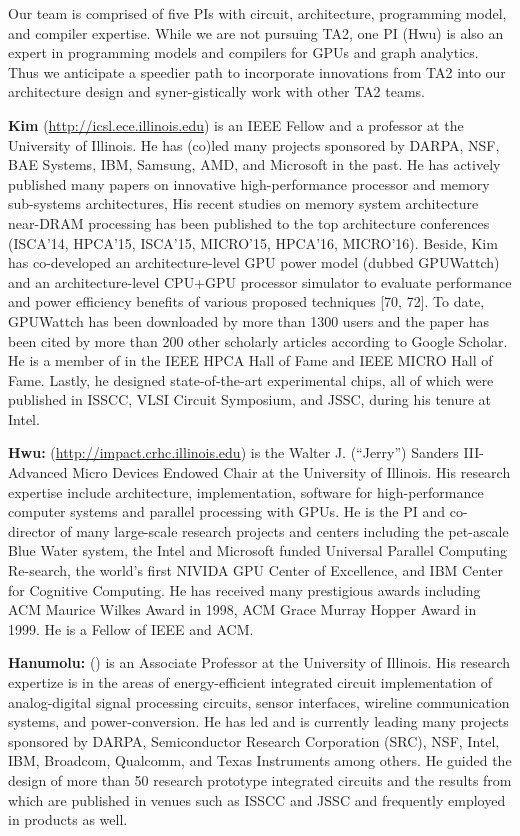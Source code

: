 Our team is comprised of five PIs with circuit, architecture, programming model, and compiler expertise. 
While we are not pursuing TA2, one PI (Hwu) is also an expert in programming models and compilers for GPUs and graph analytics. 
Thus we anticipate a speedier path to incorporate innovations from TA2 into our architecture design and syner-gistically work with other TA2 teams.

\noindent
\textbf{Kim} (\url{http://icsl.ece.illinois.edu}) is an IEEE Fellow and a professor at the University of Illinois. 
He has (co)led many projects sponsored by DARPA, NSF, BAE Systems, IBM, Samsung, AMD, and Microsoft in the past. 
He has actively published many papers on innovative high-performance processor and memory sub-systems architectures, 
His recent studies on memory system architecture near-DRAM processing has been published to the top architecture conferences (ISCA'14, HPCA'15, ISCA'15, MICRO'15, HPCA'16, MICRO'16).
Beside, Kim has co-developed an architecture-level GPU power model (dubbed GPUWattch) and an architecture-level CPU+GPU processor simulator to evaluate performance and power efficiency benefits of various proposed techniques [70, 72]. 
To date, GPUWattch has been downloaded by more than 1300 users and the paper has been cited by more than 200 other scholarly articles according to Google Scholar. 
He is a member of in the IEEE HPCA Hall of Fame and IEEE MICRO Hall of Fame. Lastly, he designed state-of-the-art experimental chips, all of which were published in ISSCC, VLSI Circuit Symposium, and JSSC, during his tenure at Intel.

\noindent
\textbf{Hwu:} (\url{http://impact.crhc.illinois.edu}) is the Walter J. (``Jerry'') Sanders III-Advanced Micro Devices Endowed Chair at the University of Illinois. 
His research expertise include architecture, implementation, software for high-performance computer systems and parallel processing with GPUs. 
He is the PI and co-director of many large-scale research projects and centers including the pet-ascale Blue Water system, the Intel and Microsoft funded Universal Parallel Computing Re-search, the world’s first NIVIDA GPU Center of Excellence, and IBM Center for Cognitive Computing. 
He has received many prestigious awards including ACM Maurice Wilkes Award in 1998, ACM Grace Murray Hopper Award in 1999. He is a Fellow of IEEE and ACM.

\noindent
\textbf{Hanumolu:} (\url{}) is an Associate Professor at the University of Illinois. 
His research expertize is in the areas of energy-efficient integrated circuit implementation of analog-digital signal processing circuits, sensor interfaces, wireline communication systems, and power-conversion. 
He has led and is currently leading many projects sponsored by DARPA, Semiconductor Research Corporation (SRC), NSF, Intel, IBM, Broadcom, Qualcomm, and Texas Instruments among others. 
He guided the design of more than 50 research prototype integrated circuits and the results from which are published in venues such as ISSCC and JSSC and frequently employed in products as well.   

